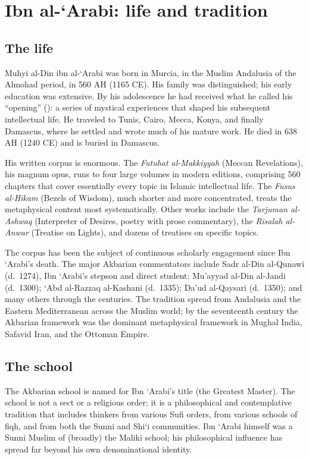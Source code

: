 \section{Ibn al-`Arabi: life and tradition}
\label{sec:ibn-arabi-life}

\subsection{The life}

Muhyi al-Din ibn al-`Arabi was born in Murcia, in the Muslim
Andalusia of the Almohad period, in 560 AH (1165 CE). His family
was distinguished; his early education was extensive. By his
adolescence he had received what he called his ``opening''
(): a series of mystical experiences that shaped his
subsequent intellectual life. He traveled to Tunis, Cairo, Mecca,
Konya, and finally Damascus, where he settled and wrote much of his
mature work. He died in 638 AH (1240 CE) and is buried in Damascus.

His written corpus is enormous. The \textit{Futuhat al-Makkiyyah}
(Meccan Revelations), his magnum opus, runs to four large volumes
in modern editions, comprising 560 chapters that cover essentially
every topic in Islamic intellectual life. The \textit{Fusus
al-Hikam} (Bezels of Wisdom), much shorter and more concentrated,
treats the metaphysical content most systematically. Other works
include the \textit{Tarjuman al-Ashwaq} (Interpreter of Desires,
poetry with prose commentary), the \textit{Risalah al-Anwar}
(Treatise on Lights), and dozens of treatises on specific topics.

The corpus has been the subject of continuous scholarly engagement
since Ibn `Arabi's death. The major Akbarian commentators include
Sadr al-Din al-Qunawi (d.~1274), Ibn `Arabi's stepson and direct
student; Mu'ayyad al-Din al-Jandi (d.~1300); `Abd al-Razzaq
al-Kashani (d.~1335); Da'ud al-Qaysari (d.~1350); and many others
through the centuries. The tradition spread from Andalusia and the
Eastern Mediterranean across the Muslim world; by the seventeenth
century the Akbarian framework was the dominant metaphysical
framework in Mughal India, Safavid Iran, and the Ottoman Empire.

\subsection{The school}

The Akbarian school is named for Ibn `Arabi's title  (the Greatest Master). The school is not a sect or a
religious order; it is a philosophical and contemplative tradition
that includes thinkers from various Sufi orders, from various
schools of fiqh, and from both the Sunni and Shi`i communities.
Ibn `Arabi himself was a Sunni Muslim of (broadly) the Maliki
school; his philosophical influence has spread far beyond his own
denominational identity.

